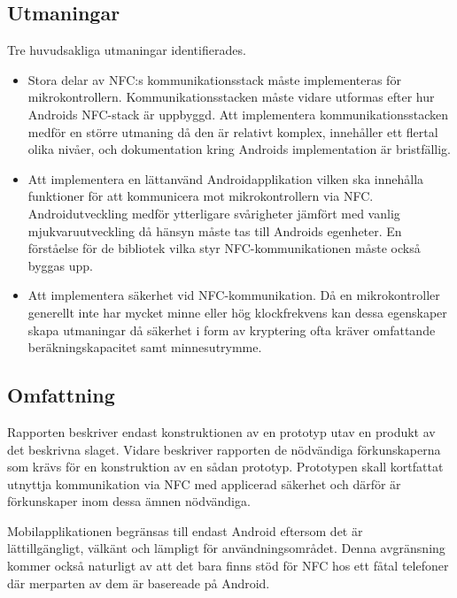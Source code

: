 \documentclass[11pt]{article}
\begin{document}
\subsection{Utmaningar}
Tre huvudsakliga utmaningar identifierades.

\begin{itemize}

\item Stora delar av NFC:s  kommunikationsstack måste implementeras för mikrokontrollern. Kommunikationsstacken måste vidare utformas efter hur Androids NFC-stack är uppbyggd. Att implementera kommunikationsstacken  medför en större utmaning då den är relativt komplex, innehåller ett flertal olika nivåer, och dokumentation kring Androids implementation är bristfällig.

\item Att implementera en lättanvänd Androidapplikation vilken ska innehålla funktioner för att kommunicera mot mikrokontrollern via NFC. Androidutveckling medför ytterligare svårigheter jämfört med vanlig mjukvaruutveckling då hänsyn måste tas till Androids egenheter. En förståelse för de bibliotek vilka styr NFC-kommunikationen måste också byggas upp.

\item Att implementera säkerhet vid NFC-kommunikation. Då en mikrokontroller generellt inte har mycket minne eller hög klockfrekvens kan dessa egenskaper skapa utmaningar då säkerhet i form av kryptering ofta kräver omfattande beräkningskapacitet samt minnesutrymme. 

\end{itemize}

\subsection{Omfattning}
Rapporten beskriver endast konstruktionen av en prototyp utav en produkt av det beskrivna slaget. Vidare beskriver rapporten de nödvändiga förkunskaperna som krävs för en konstruktion av en sådan prototyp. Prototypen skall kortfattat utnyttja kommunikation via NFC med applicerad säkerhet och därför är förkunskaper inom dessa ämnen nödvändiga. 

Mobilapplikationen begränsas till endast Android eftersom det är\\ lättillgängligt, välkänt och lämpligt för användningsområdet. Denna avgränsning kommer också naturligt av att det bara finns stöd för NFC hos ett fåtal telefoner där merparten av dem är basereade på Android.
\end{document}
